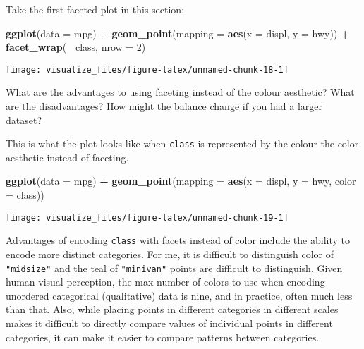 \documentclass[]{book}
\newenvironment{Shaded}{\begin{snugshade}}{\end{snugshade}}
\newcommand{\DataTypeTok}[1]{\textcolor[rgb]{0.13,0.29,0.53}{#1}}
\newcommand{\DecValTok}[1]{\textcolor[rgb]{0.00,0.00,0.81}{#1}}
\newcommand{\KeywordTok}[1]{\textcolor[rgb]{0.13,0.29,0.53}{\textbf{#1}}}
\newcommand{\NormalTok}[1]{#1}
\newcommand{\OperatorTok}[1]{\textcolor[rgb]{0.81,0.36,0.00}{\textbf{#1}}}
\newcommand{\StringTok}[1]{\textcolor[rgb]{0.31,0.60,0.02}{#1}}
\theoremstyle{plain}
\theoremstyle{remark}
\theoremstyle{definition}
\theoremstyle{definition}
\theoremstyle{definition}
\theoremstyle{remark}
\begin{document}
Take the first faceted plot in this section:

\begin{Shaded}
\begin{Highlighting}[]
\KeywordTok{ggplot}\NormalTok{(}\DataTypeTok{data =}\NormalTok{ mpg) }\OperatorTok{+}
\StringTok{  }\KeywordTok{geom_point}\NormalTok{(}\DataTypeTok{mapping =} \KeywordTok{aes}\NormalTok{(}\DataTypeTok{x =}\NormalTok{ displ, }\DataTypeTok{y =}\NormalTok{ hwy)) }\OperatorTok{+}
\StringTok{  }\KeywordTok{facet_wrap}\NormalTok{(}\OperatorTok{~}\StringTok{ }\NormalTok{class, }\DataTypeTok{nrow =} \DecValTok{2}\NormalTok{)}
\end{Highlighting}
\end{Shaded}

\begin{center}\texttt{[image: visualize\_files/figure-latex/unnamed-chunk-18-1]} \end{center}

What are the advantages to using faceting instead of the colour
aesthetic? What are the disadvantages? How might the balance change if
you had a larger dataset?

This is what the plot looks like when \texttt{class} is represented by
the colour the color aesthetic instead of faceting.

\begin{Shaded}
\begin{Highlighting}[]
\KeywordTok{ggplot}\NormalTok{(}\DataTypeTok{data =}\NormalTok{ mpg) }\OperatorTok{+}
\StringTok{  }\KeywordTok{geom_point}\NormalTok{(}\DataTypeTok{mapping =} \KeywordTok{aes}\NormalTok{(}\DataTypeTok{x =}\NormalTok{ displ, }\DataTypeTok{y =}\NormalTok{ hwy, }\DataTypeTok{color =}\NormalTok{ class))}
\end{Highlighting}
\end{Shaded}

\begin{center}\texttt{[image: visualize\_files/figure-latex/unnamed-chunk-19-1]} \end{center}

Advantages of encoding \texttt{class} with facets instead of color
include the ability to encode more distinct categories. For me, it is
difficult to distinguish color of \texttt{"midsize"} and the teal of
\texttt{"minivan"} points are difficult to distinguish. Given human
visual perception, the max number of colors to use when encoding
unordered categorical (qualitative) data is nine, and in practice, often
much less than that. Also, while placing points in different categories
in different scales makes it difficult to directly compare values of
individual points in different categories, it can make it easier to
compare patterns between categories.
\end{document}
